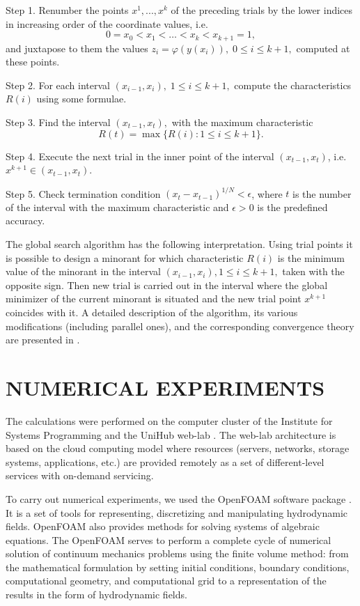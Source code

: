 \documentclass{aip-cp}
\begin{document}
Step 1. Renumber the points  $x^1,...,x^k$ of the preceding trials by the lower indices in increasing order of the coordinate values, i.e.
\begin{equation}\label{x_i}
0=x_0<x_1<\dots <x_k<x_{k+1}=1,
\end{equation}
and juxtapose to them the values $z_i=\varphi(y(x_i)), \; 0 \leq i\leq k+1,$  computed at these points.

Step 2. For each interval $(x_{i-1},x_i), \; 1\leq i \leq k+1,$ compute the characteristics $R(i)$ using some formulae.

Step 3. Find the interval $(x_{t-1},x_t),$ with the maximum characteristic \cite{Grishagin1997}
\[
R(t)=\max\{R(i):1 \leq i \leq k+1\}.
\]

Step 4. Execute the next trial in the inner point of the interval  $(x_{t-1},x_t)$, i.e. $x^{k+1} \in (x_{t-1},x_t)$.

Step 5. Check termination condition  $\left(x_t-x_{t-1}\right)^{1/N}<\epsilon$, where $t$ is the number of the interval with the maximum characteristic and $\epsilon>0$ is the predefined accuracy.

The global search algorithm has the following interpretation. Using trial points it is possible to design a minorant for which characteristic $R(i)$ is the minimum value of the minorant in the interval $(x_{i-1}, x_i ), 1 \leq i \leq k + 1,$ taken with the opposite sign. Then new trial is carried out in the interval where the global minimizer of the current minorant is situated and the new trial point $x^{k+1}$ coincides with it.
A detailed description of the algorithm, its various modifications (including parallel ones), and the corresponding convergence  theory are presented in \cite{Strongin2000,Barkalov2010,Strongin2020}.
	

\section{NUMERICAL EXPERIMENTS}

The calculations were performed on the computer cluster of the Institute for Systems Programming and the UniHub web-lab \cite{UniHub}. The web-lab architecture is based on the cloud computing model where resources (servers, networks, storage systems, applications, etc.) are provided remotely as a set of different-level services with on-demand servicing.

To carry out numerical experiments, we used the OpenFOAM software package \cite{OpenFOAM}. It is a set of tools for representing, discretizing and manipulating hydrodynamic fields. OpenFOAM also provides methods for solving systems of algebraic equations. The OpenFOAM serves to perform a complete cycle of numerical solution of continuum mechanics problems using the finite volume method: from the mathematical formulation by setting initial conditions, boundary conditions, computational geometry, and computational grid to a representation of the results in the form of hydrodynamic fields.
\end{document}
